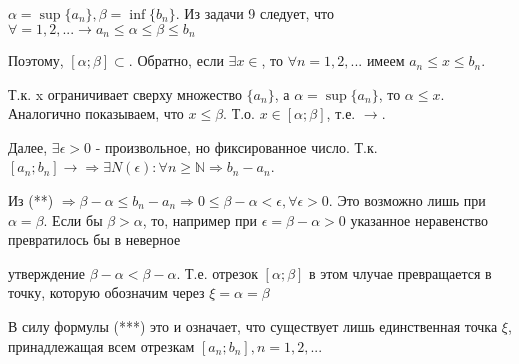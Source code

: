 \documentclass[10pt]{article}
\begin{document}
\begin{solution}
$\alpha=\sup\{a_n\},\beta=\inf\{b_n\}$. Из задачи 9 следует, что $\forall=1,2,... \rightarrow a_n \leq \alpha \leq \beta \leq b_n$

Поэтому, $[\alpha;\beta]\subset .$ Обратно, если $\exists x \in$, то $\forall n =1,2,...$ имеем $a_n \leq x \leq b_n$.

Т.к. x ограничивает сверху множество $\{a_n\}$, а $\alpha=\sup\{a_n\}$, то $\alpha \leq x$. Аналогично показываем, что $x\leq \beta$. Т.о. $x \in [\alpha;\beta]$, т.е. $\rightarrow$.

Далее, $\exists \epsilon >0$ - произвольное, но фиксированное число. Т.к. $[a_n;b_n]\rightarrow \Rightarrow \exists N(\epsilon): \forall n \geq \mathbb{N} \Rightarrow b_n - a_n$.

Из (**) $\Rightarrow \beta-\alpha \leq b_n-a_n \Rightarrow 0 \leq \beta-\alpha < \epsilon, \forall \epsilon>0$. Это возможно лишь при $\alpha=\beta$. Если бы $\beta>\alpha$, то, например при $\epsilon=\beta-\alpha>0$ указанное неравенство превратилось бы в неверное

утверждение $\beta-\alpha<\beta-\alpha$. Т.е. отрезок $[\alpha;\beta]$ в этом члучае превращается в точку, которую обозначим через   $\xi=\alpha=\beta$ 

В силу формулы (***) это и означает, что существует лишь единственная точка $\xi$, принадлежащая всем отрезкам $[a_n;b_n], n=1,2,...$
\end{solution}
\end{document}

